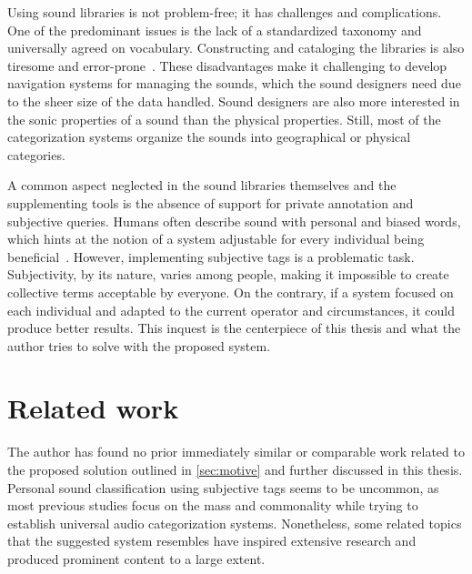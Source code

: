 Using sound libraries is not problem-free; it has challenges and complications. One of the predominant issues is the lack of a standardized taxonomy and universally agreed on vocabulary. Constructing and cataloging the libraries is also tiresome and error-prone~\cite[1]{rep:knowledge_and_content-based_audio_retrieval_using_wordnet}. These disadvantages make it challenging to develop navigation systems for managing the sounds, which the sound designers need due to the sheer size of the data handled. Sound designers are also more interested in the sonic properties of a sound than the physical properties. Still, most of the categorization systems organize the sounds into geographical or physical categories.~\cite[1]{rep:unsupervised_taxonomy_of_sound_effects}

A common aspect neglected in the sound libraries themselves and the supplementing tools is the absence of support for private annotation and subjective queries. Humans often describe sound with personal and biased words, which hints at the notion of a system adjustable for every individual being beneficial~\cite[8]{rep:an_approach_for_structuring_sound_sample_libraries_using_ontology}. However, implementing subjective tags is a problematic task. Subjectivity, by its nature, varies among people, making it impossible to create collective terms acceptable by everyone. On the contrary, if a system focused on each individual and adapted to the current operator and circumstances, it could produce better results. This inquest is the centerpiece of this thesis and what the author tries to solve with the proposed system.

\section{Related work}
The author has found no prior immediately similar or comparable work related to the proposed solution outlined in \cref{sec:motive} and further discussed in this thesis. Personal sound classification using subjective tags seems to be uncommon, as most previous studies focus on the mass and commonality while trying to establish universal audio categorization systems. Nonetheless, some related topics that the suggested system resembles have inspired extensive research and produced prominent content to a large extent.


